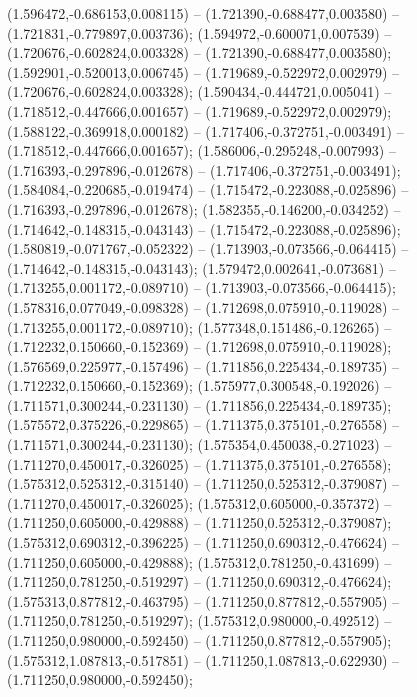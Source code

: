 (1.596472,-0.686153,0.008115) -- (1.721390,-0.688477,0.003580) -- (1.721831,-0.779897,0.003736);
 (1.594972,-0.600071,0.007539) -- (1.720676,-0.602824,0.003328) -- (1.721390,-0.688477,0.003580);
 (1.592901,-0.520013,0.006745) -- (1.719689,-0.522972,0.002979) -- (1.720676,-0.602824,0.003328);
 (1.590434,-0.444721,0.005041) -- (1.718512,-0.447666,0.001657) -- (1.719689,-0.522972,0.002979);
 (1.588122,-0.369918,0.000182) -- (1.717406,-0.372751,-0.003491) -- (1.718512,-0.447666,0.001657);
 (1.586006,-0.295248,-0.007993) -- (1.716393,-0.297896,-0.012678) -- (1.717406,-0.372751,-0.003491);
 (1.584084,-0.220685,-0.019474) -- (1.715472,-0.223088,-0.025896) -- (1.716393,-0.297896,-0.012678);
 (1.582355,-0.146200,-0.034252) -- (1.714642,-0.148315,-0.043143) -- (1.715472,-0.223088,-0.025896);
 (1.580819,-0.071767,-0.052322) -- (1.713903,-0.073566,-0.064415) -- (1.714642,-0.148315,-0.043143);
 (1.579472,0.002641,-0.073681) -- (1.713255,0.001172,-0.089710) -- (1.713903,-0.073566,-0.064415);
 (1.578316,0.077049,-0.098328) -- (1.712698,0.075910,-0.119028) -- (1.713255,0.001172,-0.089710);
 (1.577348,0.151486,-0.126265) -- (1.712232,0.150660,-0.152369) -- (1.712698,0.075910,-0.119028);
 (1.576569,0.225977,-0.157496) -- (1.711856,0.225434,-0.189735) -- (1.712232,0.150660,-0.152369);
 (1.575977,0.300548,-0.192026) -- (1.711571,0.300244,-0.231130) -- (1.711856,0.225434,-0.189735);
 (1.575572,0.375226,-0.229865) -- (1.711375,0.375101,-0.276558) -- (1.711571,0.300244,-0.231130);
 (1.575354,0.450038,-0.271023) -- (1.711270,0.450017,-0.326025) -- (1.711375,0.375101,-0.276558);
 (1.575312,0.525312,-0.315140) -- (1.711250,0.525312,-0.379087) -- (1.711270,0.450017,-0.326025);
 (1.575312,0.605000,-0.357372) -- (1.711250,0.605000,-0.429888) -- (1.711250,0.525312,-0.379087);
 (1.575312,0.690312,-0.396225) -- (1.711250,0.690312,-0.476624) -- (1.711250,0.605000,-0.429888);
 (1.575312,0.781250,-0.431699) -- (1.711250,0.781250,-0.519297) -- (1.711250,0.690312,-0.476624);
 (1.575313,0.877812,-0.463795) -- (1.711250,0.877812,-0.557905) -- (1.711250,0.781250,-0.519297);
 (1.575312,0.980000,-0.492512) -- (1.711250,0.980000,-0.592450) -- (1.711250,0.877812,-0.557905);
 (1.575312,1.087813,-0.517851) -- (1.711250,1.087813,-0.622930) -- (1.711250,0.980000,-0.592450);
